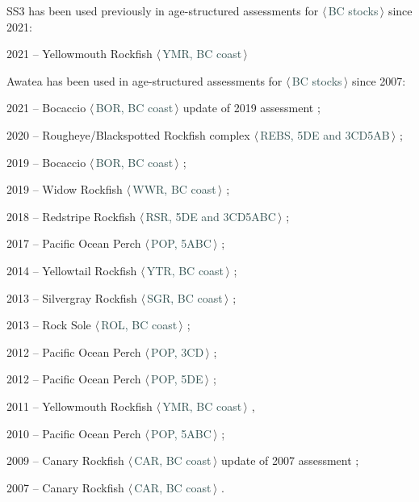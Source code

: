 \documentclass[11pt]{book}
\newcommand{\stock}[1]{$\langle$\,\textcolor{darkslategrey}{#1}\,$\rangle$}
\begin{document}
SS3 has been used previously in age-structured assessments for \stock{BC stocks} since 2021:
\begin{itemize_csas}{}{}
  \item 2021 -- Yellowmouth Rockfish \stock{YMR, BC coast} \citep{Starr-Haigh:2022_ymr}
\end{itemize_csas}

Awatea has been used in age-structured assessments for \stock{BC stocks} since 2007:
\begin{itemize_csas}{}{}
  \item 2021 -- Bocaccio \stock{BOR, BC coast} update of 2019 assessment \citep{DFO-SR:2022_bor};
  \item 2020 -- Rougheye/Blackspotted Rockfish complex \stock{REBS, 5DE and 3CD5AB} \citep{Starr-Haigh:2022_rebs};
  \item 2019 -- Bocaccio \stock{BOR, BC coast} \citep{Starr-Haigh:2022_bor};
  \item 2019 -- Widow Rockfish \stock{WWR, BC coast} \citep{Starr-Haigh:2021_wwr};
  \item 2018 -- Redstripe Rockfish \stock{RSR, 5DE and 3CD5ABC} \citep{Starr-Haigh:2021_rsr};
  \item 2017 -- Pacific Ocean Perch \stock{POP, 5ABC} \citep{Haigh-etal:2018_pop5ABC};
  \item 2014 -- Yellowtail Rockfish \stock{YTR, BC coast} \citep{DFO-SAR:2015_ytr};
  \item 2013 -- Silvergray Rockfish \stock{SGR, BC coast} \citep{Starr-etal:2016_sgr};
  \item 2013 -- Rock Sole \stock{ROL, BC coast} \citep{Holt-etal:2016_rol};
  \item 2012 -- Pacific Ocean Perch \stock{POP, 3CD} \citep{Edwards-etal:2014_pop3CD};
  \item 2012 -- Pacific Ocean Perch \stock{POP, 5DE} \citep{Edwards-etal:2014_pop5DE};
  \item 2011 -- Yellowmouth Rockfish \stock{YMR, BC coast} \citep{Edwards-etal:2012_ymr},
  \item 2010 -- Pacific Ocean Perch \stock{POP, 5ABC} \citep{Edwards-etal:2012_pop5ABC};
  \item 2009 -- Canary Rockfish \stock{CAR, BC coast} update of 2007 assessment \citep{DFO-SR:2009_car};
  \item 2007 -- Canary Rockfish \stock{CAR, BC coast} \citep{Stanley-etal:2009_car}.
\end{itemize_csas}
\end{document}
